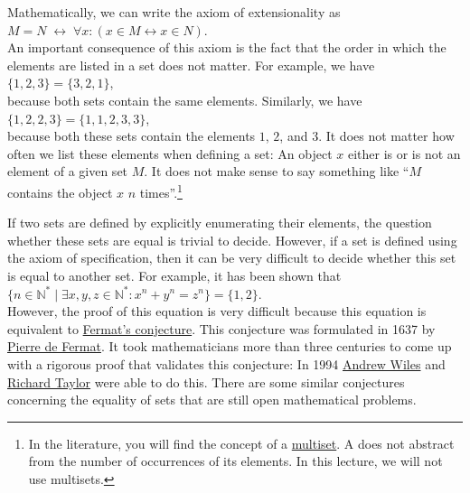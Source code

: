\noindent
Mathematically, we can write the axiom of extensionality as
\\[0.2cm]
\hspace*{1.3cm} $M = N \;\leftrightarrow\; \forall x: (x \in M \leftrightarrow x \in N)$. 
\\[0.2cm]
An important consequence of this axiom is the fact that the order in which the
elements are listed in a set does not matter.  For example, we have 
\\[0.2cm] 
\hspace*{1.3cm} $\{1,2,3\} = \{3,2,1\}$, 
\\[0.2cm]
because both sets contain the same elements.  Similarly, we have
\\[0.2cm]
\hspace*{1.3cm}
$\{1,2,2,3\} = \{1,1,2,3,3\}$,
\\[0.2cm]
because both these sets contain the elements $1$, $2$, and $3$.  It does not matter how often we list these
elements when defining a set:  An object $x$ either is or is not an element of a given set $M$.  It does not
make sense to say something like ``$M$ contains the object $x$ $n$ times''.\footnote{In the literature, you will find
the concept of a \href{https://en.wikipedia.org/wiki/Multiset}{multiset}.  A  does not abstract
from the number of occurrences of its elements.  In this lecture, we will not use multisets.}

If two sets are defined by explicitly enumerating their elements, the question whether
these sets are equal is trivial to decide.  However, if a set is defined using the axiom of specification, then
it can be very difficult to decide whether this set is equal to another set.  For 
example, it has been shown that \\[0.2cm]
\hspace*{1.3cm} 
$\{ n \in \mathbb{N}^* \mid \exists x, y, z\in\mathbb{N}^*: x^n + y^n = z^n \} = \{1, 2\}$. 
\\[0.2cm]
However, the proof of this equation is very difficult because this equation
is equivalent to \href{https://en.wikipedia.org/wiki/Fermat%27s_Last_Theorem}{Fermat's conjecture}. 
This conjecture was formulated in 1637 by \href{https://de.wikipedia.org/wiki/Pierre_de_Fermat}{Pierre de Fermat}.  
It took mathematicians more than three centuries to come up with a rigorous proof that validates this conjecture:
In 1994 \href{https://de.wikipedia.org/wiki/Andrew_Wiles}{Andrew Wiles}
and \href{https://de.wikipedia.org/wiki/Richard_Taylor_(Mathematician)}{Richard Taylor} were able to do this.
There are some similar conjectures concerning the equality of sets that are still open mathematical problems. 
\pagebreak

